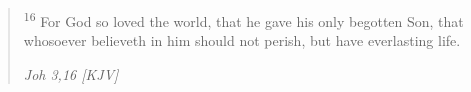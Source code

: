 \begin{quote}
\textsuperscript{16} For God so loved the world, that he gave his only begotten Son, that whosoever believeth in him should not perish, but have everlasting life.
\begin{flushright}
\emph{Joh 3,16 [KJV]}
\end{flushright}
\end{quote}